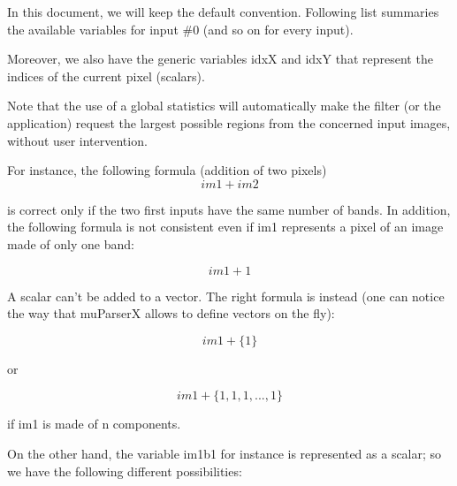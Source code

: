 In this document, we will keep the default convention. Following list 
summaries the available variables for input \#0 (and so on for every input).


Moreover, we also have the generic variables idxX and idxY that represent 
the indices of the current pixel (scalars). 

Note that the use of a global statistics will automatically make the filter 
(or the application) request the largest possible regions from the 
concerned input images, without user intervention.

\begin{center}
\end{center}

For instance, the following formula (addition of two pixels)
\begin{equation}
  im1+im2
\end{equation}
\label{firstequation}

is correct only if the two first inputs have the same number of bands. 
In addition, the following formula is not consistent even if im1 
represents a pixel of an image made of only one band:

\begin{equation}
  im1+1
\end{equation}

A scalar can't be added to a vector. The right formula is instead 
(one can notice the way that muParserX allows to define vectors on the fly):

\begin{equation}
  im1+\{ 1 \}
\end{equation}

or

\begin{equation}
  im1 + \{1,1,1,...,1\}
\end{equation}

if im1 is made of n components. 

On the other hand, the variable im1b1 for instance is represented as a 
scalar; so we have the following different possibilities:



